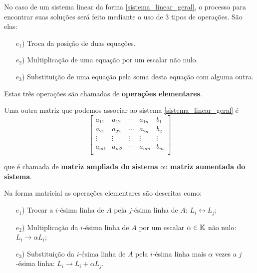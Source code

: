 \documentclass{beamer}
\begin{document}
    \begin{frame}
        No caso de um sistema linear da forma \eqref{sistema_linear_geral}, \pause o processo para encontrar suas soluções ser\'a feito mediante o uso de 3 tipos de opera\c{c}\~oes. \pause S\~ao elas:\pause
        \begin{itemize}
	    \item[$e_1$)] Troca da posi\c{c}\~ao de duas equa\c{c}\~oes.\pause
	    \item[$e_2$)] Multiplica\c{c}\~ao de uma equa\c{c}\~ao por um escalar n\~ao nulo.\pause
	    \item[$e_3$)] Substitui\c{c}\~ao de uma equa\c{c}\~ao pela soma desta equa\c{c}\~ao com alguma outra.\pause
        \end{itemize}

        Estas tr\^es opera\c{c}\~oes s\~ao chamadas de \pause \textbf{opera\c{c}\~oes elementares}.
    \end{frame}

    \begin{frame}
        Uma outra matriz que podemos associar ao sistema \eqref{sistema_linear_geral} \'e\pause
        \[
	    \begin{bmatrix}
                a_{11} & a_{12} & \cdots & a_{1n} & b_1\\
		a_{21} & a_{22} & \cdots & a_{2n} & b_2\\
		\vdots & \vdots & \vdots & \vdots & \vdots\\
		a_{m1} & a_{m2} & \cdots & a_{mn} & b_m\\
            \end{bmatrix}
        \]

        que \'e chamada de \textbf{matriz ampliada do sistema} \pause ou \textbf{matriz aumentada do sistema}.
    \end{frame}

    \begin{frame}
        Na forma matricial \pause as opera\c{c}\~oes elementares s\~ao descritas como:\pause

        \vspace{.3cm}

        \begin{itemize}
            \item[$e_1$)] Trocar a $i$-\'esima linha de $A$ \pause pela $j$-\'esima linha de $A$: \pause $L_i \leftrightarrow L_j$;\pause

            \vspace{.3cm}

            \item[$e_2$)] Multiplica\c{c}\~ao da $i$-\'esima linha de $A$ \pause por um escalar $\alpha \in \mathbb{K}$ n\~ao nulo: \pause $L_i \rightarrow \alpha L_i$;\pause

            \vspace{.3cm}

           \item[$e_3$)] Substitui\c{c}\~ao da $i$-\'esima linha de $A$ \pause pela $i$-\'esima linha mais $\alpha$ vezes a $j$-\'esima linha: \pause $L_i \rightarrow L_i + \alpha L_j$.
        \end{itemize}
    \end{frame}
\end{document}
